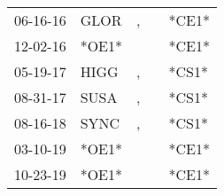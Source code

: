 \begin{supertabular}{lllll}
 06-16-16 &   GLOR &             , &               &  *CE1* \\
 12-02-16 &  *OE1* &               &               &  *CE1* \\
 05-19-17 &   HIGG &             , &               &  *CS1* \\
 08-31-17 &   SUSA &             , &               &  *CS1* \\
 08-16-18 &   SYNC &             , &               &  *CS1* \\
 03-10-19 &  *OE1* &               &               &  *CE1* \\
 10-23-19 &  *OE1* &               &               &  *CE1* \\
\end{supertabular}

